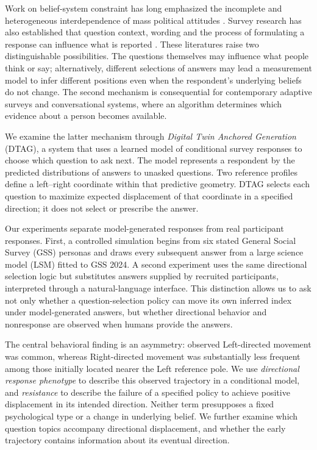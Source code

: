 \documentclass[11pt]{article}
\begin{document}
Work on belief-system constraint has long emphasized the incomplete and heterogeneous interdependence of mass political attitudes \citep{converse1964,zaller1992,baldassarri2008}. Survey research has also established that question context, wording and the process of formulating a response can influence what is reported \citep{schumanPresser1981,schwarz1999,tourangeau2000}. These literatures raise two distinguishable possibilities. The questions themselves may influence what people think or say; alternatively, different selections of answers may lead a measurement model to infer different positions even when the respondent's underlying beliefs do not change. The second mechanism is consequential for contemporary adaptive surveys and conversational systems, where an algorithm determines which evidence about a person becomes available.

We examine the latter mechanism through \emph{Digital Twin Anchored Generation} (DTAG), a system that uses a learned model of conditional survey responses to choose which question to ask next. The model represents a respondent by the predicted distributions of answers to unasked questions. Two reference profiles define a left--right coordinate within that predictive geometry. DTAG selects each question to maximize expected displacement of that coordinate in a specified direction; it does not select or prescribe the answer.

Our experiments separate model-generated responses from real participant responses. First, a controlled simulation begins from six stated General Social Survey (GSS) personas and draws every subsequent answer from a large science model (LSM) fitted to GSS 2024. A second experiment uses the same directional selection logic but substitutes answers supplied by recruited participants, interpreted through a natural-language interface. This distinction allows us to ask not only whether a question-selection policy can move its own inferred index under model-generated answers, but whether directional behavior and nonresponse are observed when humans provide the answers.

The central behavioral finding is an asymmetry: observed Left-directed movement was common, whereas Right-directed movement was substantially less frequent among those initially located nearer the Left reference pole. We use \emph{directional response phenotype} to describe this observed trajectory in a conditional model, and \emph{resistance} to describe the failure of a specified policy to achieve positive displacement in its intended direction. Neither term presupposes a fixed psychological type or a change in underlying belief. We further examine which question topics accompany directional displacement, and whether the early trajectory contains information about its eventual direction.
\end{document}
